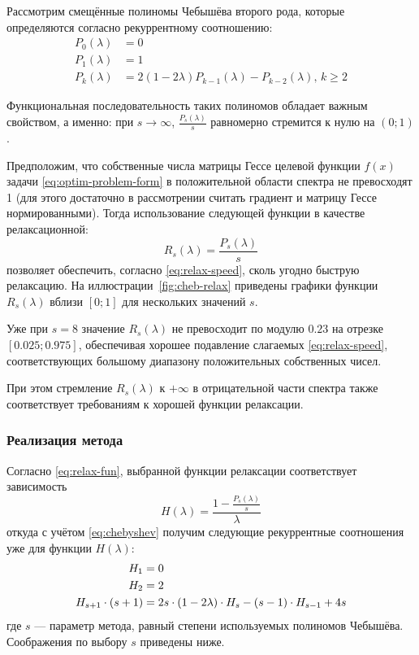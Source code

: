 Рассмотрим смещённые полиномы Чебышёва второго рода, которые
определяются согласно рекуррентному соотношению:
\begin{align}
  \label{eq:chebyshev}
  P_0(\lambda) &= 0 \\
  P_1(\lambda) &= 1 \\
  P_k(\lambda) &= 2(1-2\lambda)P_{k-1}(\lambda) - P_{k-2}(\lambda),\, k
  \geq 2
\end{align}

Функциональная последовательность таких полиномов обладает важным
свойством, а именно: при $s\to\infty$, $\frac{P_s(\lambda)}{s}$
равномерно стремится к нулю на $(0;1)$.

Предположим, что собственные числа матрицы Гессе целевой функции
$f(x)$ задачи \eqref{eq:optim-problem-form} в положительной области
спектра не превосходят 1 (для этого достаточно в рассмотрении считать
градиент и матрицу Гессе нормированными). Тогда использование
следующей функции в качестве релаксационной:
\begin{equation}
  \label{eq:cheb-relax}
  R_s(\lambda) = \frac{P_s(\lambda)}{s}
\end{equation}
позволяет обеспечить, согласно \eqref{eq:relax-speed}, сколь угодно
быструю релаксацию. На иллюстрации \ref{fig:cheb-relax} приведены
графики функции $R_s(\lambda)$ вблизи $[0;1]$ для нескольких значений
$s$.



Уже при $s=8$ значение $R_s(\lambda)$ не превосходит по модулю $0.23$
на отрезке $[0.025; 0.975]$, обеспечивая хорошее подавление слагаемых
\eqref{eq:relax-speed}, соответствующих большому диапазону
положительных собственных чисел.

При этом стремление $R_s(\lambda)$ к $+\infty$ в
отрицательной части спектра также соответствует требованиям к хорошей
функции релаксации.

\subsubsection{Реализация метода}
Согласно \eqref{eq:relax-fun}, выбранной функции релаксации
соответствует зависимость
\begin{equation*}
  H(\lambda) = \frac{1-\frac{P_s(\lambda)}{s}}{\lambda}
\end{equation*}
откуда с учётом \eqref{eq:chebyshev} получим следующие рекуррентные
соотношения уже для функции $H(\lambda)$:
\begin{equation}
  \label{eq:cheb-scalarfun}
  \begin{aligned}
    H_1 &= 0 \\
    H_2 &= 2 \\
    H_{s+1} \cdot (s+1) &= 2s\cdot(1-2\lambda)\cdot H_s-(s-1)\cdot
    H_{s-1}+4s
  \end{aligned}
\end{equation}
где $s$ — параметр метода, равный степени используемых полиномов
Чебышёва. Соображения по выбору $s$ приведены ниже.

